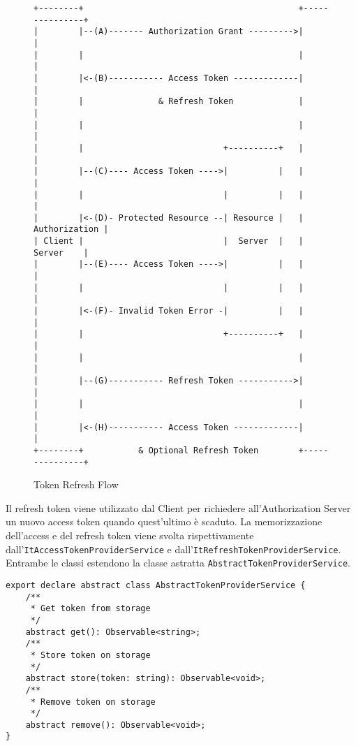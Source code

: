 \begin{figure}[h]
\begin{center}
\label{fig:refreshflow}
\begin{verbatim}
+--------+                                           +---------------+
|        |--(A)------- Authorization Grant --------->|               |
|        |                                           |               |
|        |<-(B)----------- Access Token -------------|               |
|        |               & Refresh Token             |               |
|        |                                           |               |
|        |                            +----------+   |               |
|        |--(C)---- Access Token ---->|          |   |               |
|        |                            |          |   |               |
|        |<-(D)- Protected Resource --| Resource |   | Authorization |
| Client |                            |  Server  |   |     Server    |
|        |--(E)---- Access Token ---->|          |   |               |
|        |                            |          |   |               |
|        |<-(F)- Invalid Token Error -|          |   |               |
|        |                            +----------+   |               |
|        |                                           |               |
|        |--(G)----------- Refresh Token ----------->|               |
|        |                                           |               |
|        |<-(H)----------- Access Token -------------|               |
+--------+           & Optional Refresh Token        +---------------+

\end{verbatim}
\caption{Token Refresh Flow \cite{REFRESH}}
\end{center}
\end{figure}
\FloatBarrier 
Il refresh token viene utilizzato dal Client per richiedere all'Authorization Server un nuovo access token quando quest'ultimo è scaduto.
La memorizzazione dell'access e del refresh token viene svolta rispettivamente dall'\verb|ItAccessTokenProviderService| e dall'\verb|ItRefreshTokenProviderService|.
Entrambe le classi estendono la classe astratta \verb|AbstractTokenProviderService|.\\
\begin{lstlisting}[caption={Classe astratta AbstractTokenProviderService}, style=javaScriptCode]
export declare abstract class AbstractTokenProviderService {
    /**
     * Get token from storage
     */
    abstract get(): Observable<string>;
    /**
     * Store token on storage
     */
    abstract store(token: string): Observable<void>;
    /**
     * Remove token on storage
     */
    abstract remove(): Observable<void>;
}
\end{lstlisting}
